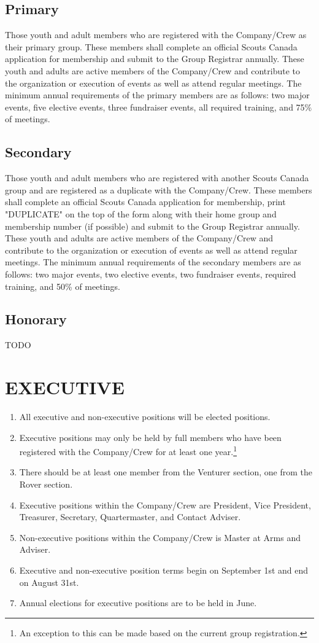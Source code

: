 \documentclass{Service_Corps_Document}
\begin{document}
\subsection{Primary}
Those youth and adult members who are registered with the Company/Crew as their primary group. These members shall complete an official Scouts Canada application for membership and submit to the Group Registrar annually. These youth and adults are active members of the Company/Crew and contribute to the organization or execution of events as well as attend regular meetings. The minimum annual requirements of the primary members are as follows: two major events, five elective events, three fundraiser events, all required training, and 75\% of meetings.
\subsection{Secondary}
Those youth and adult members who are registered with another Scouts Canada group and are registered as a duplicate with the Company/Crew. These members shall complete an official Scouts Canada application for membership, print "DUPLICATE" on the top of the form along with their home group and membership number (if possible) and submit to the Group Registrar annually. These youth and adults are active members of the Company/Crew and contribute to the organization or execution of events as well as attend regular meetings. The minimum annual requirements of the secondary members are as follows: two major events, two elective events, two fundraiser events, required training, and 50\% of meetings. 
\subsection{Honorary}
TODO
\section{EXECUTIVE}
\begin{enumerate}
	\item All executive and non-executive positions will be elected positions.
	\item Executive positions may only be held by full members who have been registered with the Company/Crew for at least one year.\footnote{An exception to this can be made based on the current group registration.}
	\item There should be at least one member from the Venturer section, one from the Rover section. \footnotemark[\value{footnote}]
	\item Executive positions within the Company/Crew are President, Vice President, Treasurer, Secretary, Quartermaster, and Contact Adviser.
	\item Non-executive positions within the Company/Crew is Master at Arms and Adviser. 
	\item Executive and non-executive position terms begin on September 1st and end on August 31st.
	\item Annual elections for executive positions are to be held in June.
\end{enumerate}
\end{document}
